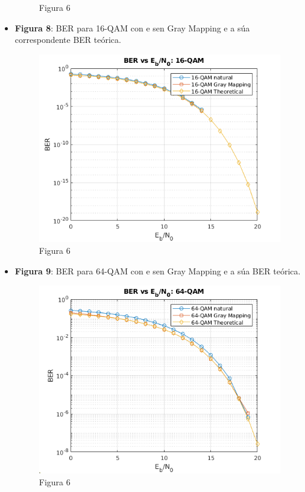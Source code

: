 \documentclass[
	10pt, %
	spanish, %
]{fphw}
\begin{document}
\begin{itemize}
\begin{figure}[htb]
\caption{Figura 6}
\end{figure}
\item \textbf{Figura 8}: BER para 16-QAM con e sen Gray Mapping e a súa correspondente BER teórica.
\begin{figure}[htb]
\centering 
\includegraphics{figura8.png}
\caption{Figura 6}
\end{figure}
\item \textbf{Figura 9}: BER para 64-QAM con e sen Gray Mapping e a súa BER teórica.
\begin{figure}[htb]
\centering 
\includegraphics{figura9.png}
\caption{Figura 6}
\end{figure}
\end{itemize}
\end{document}
